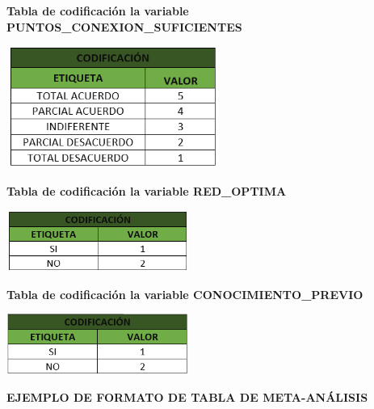 \documentclass[12pt, a4paper, nofontenc, numbers=endperiod]{apa7}
\begin{document}
{\begin{center}
\end{center}
\newpage
\textbf{Tabla de codificación la variable PUNTOS\_CONEXION\_SUFICIENTES}
\begin{center}
	\includegraphics[width=7cm,height=4cm]{Imagenes/Figura27}
\end{center}

\textbf{Tabla de codificación la variable RED\_OPTIMA}

\begin{center}
	\includegraphics[width=6cm,height=2cm]{Imagenes/Figura28}
\end{center}

\textbf{Tabla de codificación la variable CONOCIMIENTO\_PREVIO}
\begin{center}
	\includegraphics[width=6cm,height=2cm]{Imagenes/Figura29}
\end{center}

\clearpage


\begin{center}
	\textbf{EJEMPLO DE FORMATO DE TABLA DE META-ANÁLISIS} 
\end{center}

\begin{center}
	{\scriptsize \singlespacing
		
		\renewcommand{\multirowsetup}{\centering}	{\renewcommand{\arraystretch}{1.5}
			\begin{tabular}{|p{2.5cm}|p{4cm}|p{1cm}|p{0.5cm}|p{1.5cm}|p{3.5cm}|}
				

\end{tabular}}}
\end{center}}
\end{document}
